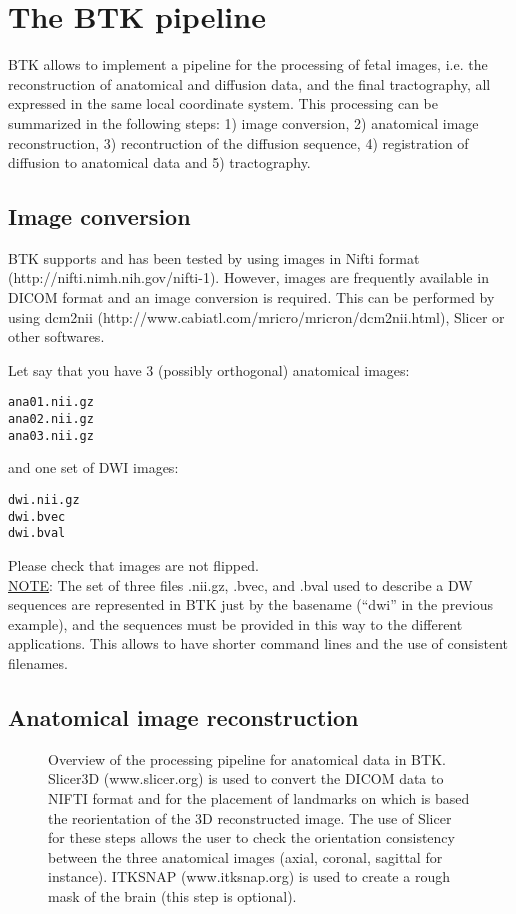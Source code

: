 \section{The BTK pipeline}
BTK allows to implement a pipeline for the processing of fetal images,
i.e. the reconstruction of anatomical and diffusion data, and the final
tractography, all expressed in the same local coordinate system. This
processing can be summarized in the following steps: 1) image conversion, 2) anatomical image reconstruction, 3)
recontruction of the diffusion sequence, 4) registration of diffusion to anatomical data and 5)
tractography.

\subsection{Image conversion}
BTK supports and has been tested by using images in Nifti format
(http://nifti.nimh.nih.gov/nifti-1). However, images are frequently available in
DICOM format and an image conversion is required. This can be performed by using
dcm2nii (http://www.cabiatl.com/mricro/mricron/dcm2nii.html), Slicer or other softwares.

Let say that you have 3 (possibly orthogonal) anatomical images:
\begin{verbatim}
ana01.nii.gz 
ana02.nii.gz 
ana03.nii.gz 
\end{verbatim}

and one set of DWI images: 
\begin{verbatim}
dwi.nii.gz
dwi.bvec 
dwi.bval 
\end{verbatim}

Please check that images are not flipped.\\

\underline{NOTE}: The set of three files .nii.gz, .bvec, and .bval used to
describe a DW sequences are represented in BTK just by the basename (``dwi'' in
the previous example), and the sequences must be provided in this way to the
different applications. This allows to have shorter command lines and the use
of consistent filenames.

\subsection{Anatomical image reconstruction}


  \begin{figure*}[!htb]
   \caption{Overview of the processing pipeline for anatomical data in BTK. Slicer3D (www.slicer.org) is used to convert the DICOM data to NIFTI format and for the placement of landmarks on which is based the reorientation of the 3D reconstructed image. The use of Slicer for these steps allows the user to check the orientation consistency between the three anatomical images (axial, coronal, sagittal for instance). ITKSNAP (www.itksnap.org) is used to create a rough mask of the brain (this step is optional).}
   \label{fig:anatomical_pipeline}
 \end{figure*}

